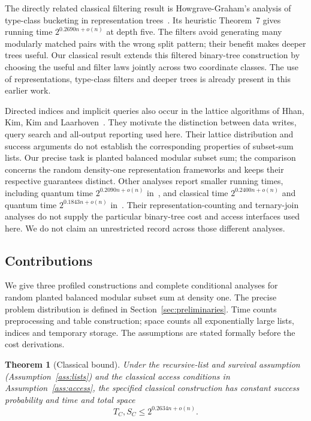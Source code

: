 \documentclass[10pt,a4paper]{article}
\newtheorem{theorem}{Theorem}[section]
\theoremstyle{definition}
\begin{document}
The directly related classical filtering result is Howgrave-Graham's
analysis of type-class bucketing in representation trees~\cite{HG26}.
Its heuristic Theorem~7 gives running time $2^{0.2690n+o(n)}$ at depth
five. The filters
avoid generating many modularly matched pairs with the wrong split
pattern; their benefit makes deeper trees useful. Our classical result
extends this filtered binary-tree construction by choosing the useful
and filter laws jointly across two coordinate classes. The use of
representations, type-class filters and deeper trees is already present
in this earlier work.

Directed indices and implicit queries also occur in the lattice
algorithms of Hhan, Kim, Kim and Laarhoven~\cite[Lemmas~8.3 and~8.4]{HKKL}.
They motivate the distinction between data writes, query search and
all-output reporting used here. Their lattice distribution and success
arguments do not establish the corresponding properties of subset-sum
lists. Our precise task is planted balanced modular subset sum; the comparison
concerns the random density-one representation frameworks and keeps
their respective guarantees distinct. Other analyses report smaller
running times, including quantum time $2^{0.2090n+o(n)}$
in~\cite{LiLi}, and classical
time $2^{0.2400n+o(n)}$ and quantum time $2^{0.1843n+o(n)}$
in~\cite{Li}. Their representation-counting and ternary-join
analyses do not supply the particular binary-tree cost and access
interfaces used here. We do not claim an unrestricted record
across those different analyses.

\subsection{Contributions}
We give three profiled constructions and complete conditional analyses
for random planted balanced modular subset sum at density one. The
precise problem distribution is defined in Section~\ref{sec:preliminaries}.
Time counts preprocessing and table construction; space counts all
exponentially large lists, indices and temporary storage. The assumptions
are stated formally before the cost derivations.

\begin{theorem}[Classical bound]\label{thm:classical}
Under the recursive-list and survival assumption
(Assumption~\ref{ass:lists}) and the classical access conditions in
Assumption~\ref{ass:access}, the specified classical construction has
constant success probability and time and total space
\[
 T_C,S_C\le 2^{0.2634n+o(n)}.
\]
\end{theorem}
\end{document}
